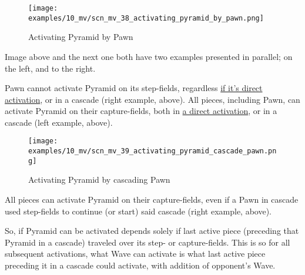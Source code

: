 \vspace*{-1.4\baselineskip}
\noindent
\begin{figure}[!h]
\texttt{[image: examples/10\_mv/scn\_mv\_38\_activating\_pyramid\_by\_pawn.png]}
\vspace*{-1.3\baselineskip}
\caption{Activating Pyramid by Pawn}
\label{fig:scn_mv_38_activating_pyramid_by_pawn}
\end{figure}

\vspace*{-0.3\baselineskip}
Image above and the next one both have two examples presented in parallel; on the left,
and to the right.

Pawn cannot activate Pyramid on its step-fields, regardless
\hyperref[fig:scn_ma_04_pyramid_activation_by_pawn]{if it's direct activation}, or in a cascade
(right example, above). All pieces, including Pawn, can activate Pyramid on their capture-fields,
both in \hyperref[fig:scn_ma_01_pyramid_activation_init]{a direct activation}, or in a cascade
(left example, above).

\clearpage %

\vspace*{-2.5\baselineskip}
\noindent
\begin{figure}[!h]
\texttt{[image: examples/10\_mv/scn\_mv\_39\_activating\_pyramid\_cascade\_pawn.png]}
\vspace*{-1.5\baselineskip}
\caption{Activating Pyramid by cascading Pawn}
\label{fig:scn_mv_39_activating_pyramid_cascade_pawn}
\end{figure}

\vspace*{-0.5\baselineskip}
All pieces can activate Pyramid on their capture-fields, even if a Pawn in cascade
used step-fields to continue (or start) said cascade (right example, above).

So, if Pyramid can be activated depends solely if last active piece (preceding that
Pyramid in a cascade) traveled over its step- or capture-fields. This is so for all
subsequent activations, what Wave can activate is what last active piece preceding
it in a cascade could activate, with addition of opponent's Wave.

\clearpage %

